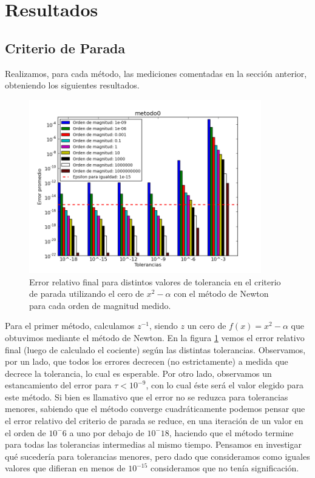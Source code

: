 \section{Resultados}

\subsection{Criterio de Parada}
Realizamos, para cada método, las mediciones comentadas en la sección anterior, obteniendo los siguientes resultados.
\begin{figure}[H]
  \centering
    \includegraphics[width=0.9\textwidth]{../data/metodo0.png}
    \caption{Error relativo final para distintos valores de tolerancia en el criterio de parada utilizando el cero de $x^2-\alpha$ con el método de Newton para cada orden de magnitud medido.}
    \label{paradaMet0}
\end{figure}

Para el primer método, calculamos $z^{-1}$, siendo $z$ un cero de $f(x) = x^2-\alpha$ que obtuvimos mediante el método de Newton. En la figura \ref{paradaMet0} vemos el error relativo final (luego de calculado el cociente) según las distintas tolerancias. Observamos, por un lado, que todos los errores decrecen (no estrictamente) a medida que decrece la tolerancia, lo cual es esperable. Por otro lado, observamos un estancamiento del error para $\tau < 10^{-9}$, con lo cual éste será el valor elegido para este método. Si bien es llamativo que el error no se reduzca para tolerancias menores, sabiendo que el método converge cuadráticamente podemos pensar que el error relativo del criterio de parada se reduce, en una iteración de un valor en el orden de $10^-6$ a uno por debajo de $10^-18$, haciendo que el método termine para todas las tolerancias intermedias al mismo tiempo. Pensamos en investigar qué sucedería para tolerancias menores, pero dado que consideramos como iguales valores que difieran en menos de $10^{-15}$ consideramos que no tenía significación.

